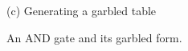 \begin{figure}[ht]
\begin{minipage}[c][4cm][b]{0.40\linewidth}
        \vspace{0.4cm}

        (c) Generating a garbled table
    \end{minipage}
    \vspace{0.4cm}

    \caption{An AND gate and its garbled form.}
    \label{fig:garbling-and-gate}
\end{figure}